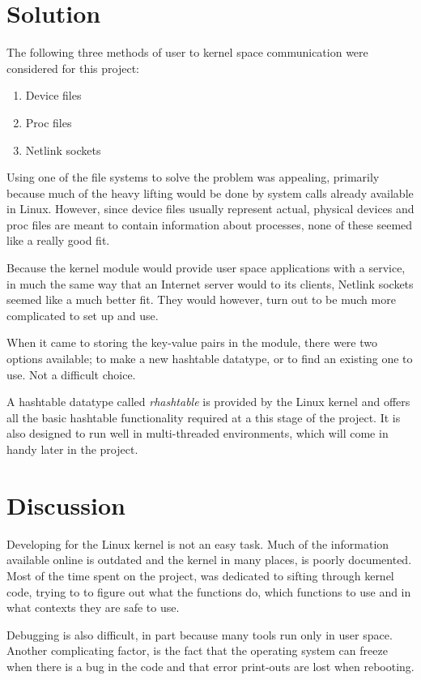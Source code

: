 \documentclass[final,a4paper]{article}
\begin{document}
\section*{Solution}
The following three methods of user to kernel space communication were
considered for this project:
\begin{enumerate}
  \setlength\itemsep{0em}
  \item Device files
  \item Proc files
  \item Netlink sockets
\end{enumerate}
Using one of the file systems to solve the problem was appealing, primarily
because much of the heavy lifting would be done by system calls already
available in Linux. However, since device files usually represent actual,
physical devices and proc files are meant to contain information about
processes, none of these seemed like a really good fit.

Because the kernel module would provide user space applications with a service,
in much the same way that an Internet server would to its clients, Netlink
sockets seemed like a much better fit. They would however, turn out to be much
more complicated to set up and use.

When it came to storing the key-value pairs in the module, there were two
options available; to make a new hashtable datatype, or to find an existing
one to use. Not a difficult choice.

A hashtable datatype called \emph{rhashtable} is provided by the
Linux kernel and offers all the basic hashtable functionality required
at a this stage of the project. It is also designed to run well in
multi-threaded environments, which will come in handy later in the project.

\section*{Discussion}
Developing for the Linux kernel is not an easy task. Much of the information
available online is outdated and the kernel in many places, is poorly
documented. Most of the time spent on the project, was dedicated to sifting
through kernel code, trying to to figure out what the functions do, which
functions to use and in what contexts they are safe to use.

Debugging is also difficult, in part because many tools run only in user space.
Another complicating factor, is the fact that the operating system can freeze
when there is a bug in the code and that error print-outs are lost when
rebooting.
\end{document}
